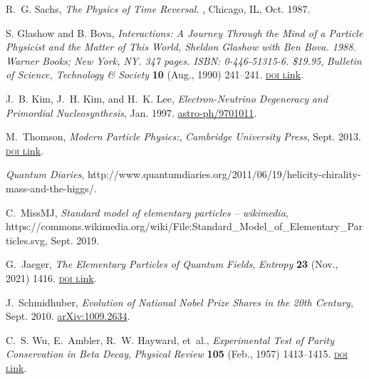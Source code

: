 \documentclass[ALICE,manyauthors]{cernphprep}
\begin{document}
\begin{thebibliography}{100}
R.~G. Sachs, {\em The {{Physics}} of {{Time Reversal}}}.
, {Chicago, IL}, Oct. 1987.

{S. Glashow} and {B. Bova}, {\it Interactions: {{A Journey Through}} the
  {{Mind}} of a {{Particle Physicist}} and the {{Matter}} of {{This World}},
  {{Sheldon Glashow}} with {{Ben Bova}}. 1988. {{Warner Books}}; {{New York}},
  {{NY}}. 347 pages. {{ISBN}}: 0-446-51315-6. \$19.95},  {\textsl{Bulletin of
  Science, Technology \& Society}} {\footnotesize \bf 10} (Aug., 1990)
  241--241. \href{http://dx.doi.org/10.1177/027046769001000421}{\footnotesize
  \textrm{\textsc{doi l}ink}}.

J.~B. Kim, J.~H. Kim, and H.~K. Lee, {\it Electron-{{Neutrino Degeneracy}} and
  {{Primordial Nucleosynthesis}}},  Jan. 1997.
\newblock \href{https://arxiv.org/abs/astro-ph/9701011}{{\footnotesize
  astro-ph/9701011}}.

M.~Thomson, {\it Modern {{Particle Physics}}:},  {\textsl{{Cambridge University
  Press}}}, Sept. 2013.
\newblock \href{http://dx.doi.org/10.1017/CBO9781139525367}{\footnotesize
  \textrm{\textsc{doi l}ink}}.

{\it Quantum {{Diaries}}},
  http://www.quantumdiaries.org/2011/06/19/helicity-chirality-mass-and-the-higgs/.

C.~MissMJ, {\it Standard model of elementary particles -- wikimedia},
  https://commons.wikimedia.org/wiki/File:Standard\_Model\_of\_Elementary\_Particles.svg,
  Sept. 2019.

G.~Jaeger, {\it The {{Elementary Particles}} of {{Quantum Fields}}},
  {\textsl{Entropy}} {\footnotesize \bf 23} (Nov., 2021) 1416.
  \href{http://dx.doi.org/10.3390/e23111416}{\footnotesize \textrm{\textsc{doi
  l}ink}}.

J.~Schmidhuber, {\it Evolution of {{National Nobel Prize Shares}} in the 20th
  {{Century}}},  Sept. 2010.
\newblock \href{https://arxiv.org/abs/1009.2634}{{\footnotesize
  arXiv:1009.2634}}.

C.~S. Wu, E.~Ambler, R.~W. Hayward, et~al., {\it Experimental {{Test}} of
  {{Parity Conservation}} in {{Beta Decay}}},  {\textsl{Physical Review}}
  {\footnotesize \bf 105} (Feb., 1957) 1413--1415.
  \href{http://dx.doi.org/10.1103/PhysRev.105.1413}{\footnotesize
  \textrm{\textsc{doi l}ink}}.


\end{thebibliography}
\end{document}
